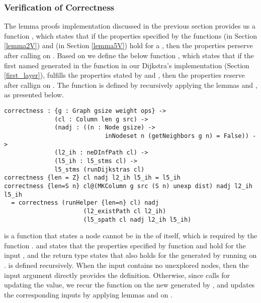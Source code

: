 \subsubsection{Verification of Correctness}
The lemma proofs implementation discussed in the previous section provides us a function , which states that if the  properties specified by the functions  (in Section \ref{lemma2V}) and (in Section \ref{lemma5V}) hold for a  , then the properties perserve after calling  on . Based on  we define the below function , which states that if the first  named  generated in the  function in our Dijkstra's implementation (Section \ref{first_layer}), fulfills the properties stated by  and , then the properties reserve after callign  on . The function  is defined by recursively applying the lemmas  and , as presented below. 
\\
\begin{lstlisting}
correctness : {g : Graph gsize weight ops} ->
              (cl : Column len g src) ->
              (nadj : ((n : Node gsize) -> 
                            inNodeset n (getNeighbors g n) = False)) ->
              (l2_ih : neDInfPath cl) ->
              (l5_ih : l5_stms cl) ->
              l5_stms (runDijkstras cl)
correctness {len = Z} cl nadj l2_ih l5_ih = l5_ih
correctness {len=S n} cl@(MKColumn g src (S n) unexp dist) nadj l2_ih l5_ih
  = correctness (runHelper {len=n} cl) nadj 
  				      (l2_existPath cl l2_ih) 
  				      (l5_spath cl nadj l2_ih l5_ih)
\end{lstlisting}


 is a function that states a node cannot be in the  of itself, which is required by the function .  and  states that the properties specified by function  and  hold for the input  , and the return type states that  also holds for the  generated by running  on .  is defined recursively. When the input  contains no unexplored nodes, then the input argument  directly provides the definition. Otherwise, since  calls  for updating the  value, we recur the  function on the new  generated by , and updates the corresponding inputs by applying lemmas  and  on . 
\\

